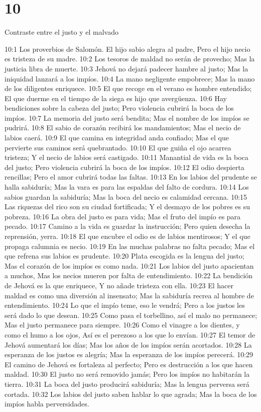 \chapter{10}

Contraste entre el justo y el malvado  

10:1 Los proverbios de Salomón.  
El hijo sabio alegra al padre,  
Pero el hijo necio es tristeza de su madre.  
10:2 Los tesoros de maldad no serán de provecho;  
Mas la justicia libra de muerte.  
10:3 Jehová no dejará padecer hambre al justo;  
Mas la iniquidad lanzará a los impíos.  
10:4 La mano negligente empobrece;  
Mas la mano de los diligentes enriquece.  
10:5 El que recoge en el verano es hombre entendido;  
El que duerme en el tiempo de la siega es hijo que avergüenza.  
10:6 Hay bendiciones sobre la cabeza del justo;  
Pero violencia cubrirá la boca de los impíos.  
10:7 La memoria del justo será bendita;  
Mas el nombre de los impíos se pudrirá.  
10:8 El sabio de corazón recibirá los mandamientos;  
Mas el necio de labios caerá.  
10:9 El que camina en integridad anda confiado;  
Mas el que pervierte sus caminos será quebrantado.  
10:10 El que guiña el ojo acarrea tristeza;  
Y el necio de labios será castigado.  
10:11 Manantial de vida es la boca del justo;  
Pero violencia cubrirá la boca de los impíos.  
10:12 El odio despierta rencillas;  
Pero el amor cubrirá todas las faltas. 
10:13 En los labios del prudente se halla sabiduría;  
Mas la vara es para las espaldas del falto de cordura.  
10:14 Los sabios guardan la sabiduría;  
Mas la boca del necio es calamidad cercana.  
10:15 Las riquezas del rico son su ciudad fortificada;  
Y el desmayo de los pobres es su pobreza.  
10:16 La obra del justo es para vida;  
Mas el fruto del impío es para pecado.  
10:17 Camino a la vida es guardar la instrucción;  
Pero quien desecha la reprensión, yerra.  
10:18 El que encubre el odio es de labios mentirosos;  
Y el que propaga calumnia es necio.  
10:19 En las muchas palabras no falta pecado;  
Mas el que refrena sus labios es prudente.  
10:20 Plata escogida es la lengua del justo;  
Mas el corazón de los impíos es como nada.  
10:21 Los labios del justo apacientan a muchos,  
Mas los necios mueren por falta de entendimiento.  
10:22 La bendición de Jehová es la que enriquece,  
Y no añade tristeza con ella.  
10:23 El hacer maldad es como una diversión al insensato;  
Mas la sabiduría recrea al hombre de entendimiento.  
10:24 Lo que el impío teme, eso le vendrá;  
Pero a los justos les será dado lo que desean.  
10:25 Como pasa el torbellino, así el malo no permanece;  
Mas el justo permanece para siempre.  
10:26 Como el vinagre a los dientes, y como el humo a los ojos,  
Así es el perezoso a los que lo envían.  
10:27 El temor de Jehová aumentará los días;  
Mas los años de los impíos serán acortados.  
10:28 La esperanza de los justos es alegría;  
Mas la esperanza de los impíos perecerá.  
10:29 El camino de Jehová es fortaleza al perfecto;  
Pero es destrucción a los que hacen maldad.  
10:30 El justo no será removido jamás;  
Pero los impíos no habitarán la tierra.  
10:31 La boca del justo producirá sabiduría;  
Mas la lengua perversa será cortada.  
10:32 Los labios del justo saben hablar lo que agrada;  
Mas la boca de los impíos habla perversidades.  

